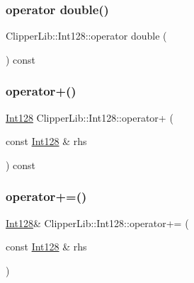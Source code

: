 \mbox{\label{class_clipper_lib_1_1_int128_aff43efe690619303c4b0a513834d5296}} 
\subsubsection{\texorpdfstring{operator double()}{operator double()}}
{\footnotesize\ttfamily Clipper\+Lib\+::\+Int128\+::operator double (\begin{DoxyParamCaption}{ }\end{DoxyParamCaption}) const\hspace{0.3cm}{\ttfamily [inline]}}

\mbox{\label{class_clipper_lib_1_1_int128_ad32b1394a82ddf0d9f7da299b91212bd}} 
\subsubsection{\texorpdfstring{operator+()}{operator+()}}
{\footnotesize\ttfamily \mbox{\hyperlink{class_clipper_lib_1_1_int128}{Int128}} Clipper\+Lib\+::\+Int128\+::operator+ (\begin{DoxyParamCaption}\item[{const \mbox{\hyperlink{class_clipper_lib_1_1_int128}{Int128}} \&}]{rhs }\end{DoxyParamCaption}) const\hspace{0.3cm}{\ttfamily [inline]}}

\mbox{\label{class_clipper_lib_1_1_int128_ad48a700134ab5c4e08bd53966b731950}} 
\subsubsection{\texorpdfstring{operator+=()}{operator+=()}}
{\footnotesize\ttfamily \mbox{\hyperlink{class_clipper_lib_1_1_int128}{Int128}}\& Clipper\+Lib\+::\+Int128\+::operator+= (\begin{DoxyParamCaption}\item[{const \mbox{\hyperlink{class_clipper_lib_1_1_int128}{Int128}} \&}]{rhs }\end{DoxyParamCaption})\hspace{0.3cm}{\ttfamily [inline]}}

